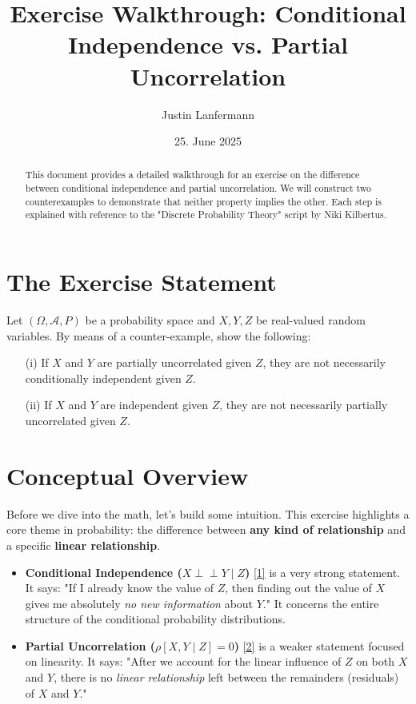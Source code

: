 \documentclass[11pt,a4paper]{article}
\title{Exercise Walkthrough: Conditional Independence vs. Partial Uncorrelation}
\author{Justin Lanfermann}
\date{25. June 2025}
\begin{document}
\maketitle

\begin{abstract}
    This document provides a detailed walkthrough for an exercise on the difference between conditional independence and partial uncorrelation. We will construct two counterexamples to demonstrate that neither property implies the other. Each step is explained with reference to the "Discrete Probability Theory" script by Niki Kilbertus.
\end{abstract}

\section{The Exercise Statement}
Let $(\Omega, \mathcal{A}, P)$ be a probability space and $X, Y, Z$ be real-valued random variables. By means of a counter-example, show the following:
\begin{enumerate}
    \item[(i)] If $X$ and $Y$ are partially uncorrelated given $Z$, they are not necessarily conditionally independent given $Z$.
    \item[(ii)] If $X$ and $Y$ are independent given $Z$, they are not necessarily partially uncorrelated given $Z$.
\end{enumerate}

\section{Conceptual Overview}
Before we dive into the math, let's build some intuition. This exercise highlights a core theme in probability: the difference between \textbf{any kind of relationship} and a specific \textbf{linear relationship}.

\begin{itemize}
    \item \textbf{Conditional Independence ($X \perp\perp Y \mid Z$)} \hyperlink{note1}{[1]} is a very strong statement. It says: "If I already know the value of $Z$, then finding out the value of $X$ gives me absolutely \emph{no new information} about $Y$." It concerns the entire structure of the conditional probability distributions.

    \item \textbf{Partial Uncorrelation ($\rho[X, Y \mid Z] = 0$)} \hyperlink{note2}{[2]} is a weaker statement focused on linearity. It says: "After we account for the linear influence of $Z$ on both $X$ and $Y$, there is no \emph{linear relationship} left between the remainders (residuals) of $X$ and $Y$."
\end{itemize}
\end{document}
